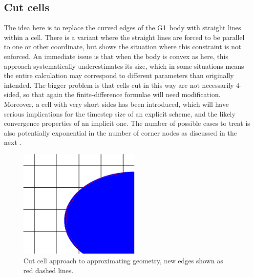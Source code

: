 \clearpage
\subsection{Cut cells}\label{sec:cutcells}
The idea here is to replace the curved edges of the G1~body with straight lines within
a cell. There is a variant where the straight lines are forced to be parallel to one
or other coordinate, but  shows the situation where this constraint is
not enforced. An immediate issue is that when the body is convex as here, this approach
systematically underestimates its size, which in some situations means the entire
calculation may correspond to different parameters than originally intended.
The bigger problem is that cells cut in this way are not necessarily $4$-sided,
so that again the finite-difference formulae will need modification. Moreover, a 
cell with very short sides has been introduced, which will have serious
implications for the timestep size of an explicit scheme, and the likely
convergence properties of an implicit one. The number of possible cases to treat
is also potentially exponential in the number of corner nodes as discussed in
the next .
\begin{figure}
\centerline{\includegraphics[width=6cm]{../pics/meshd2} }
\caption{Cut cell approach to approximating geometry, new edges shown as red dashed lines.
\label{fig:meshd2}}
\end{figure}


\clearpage
